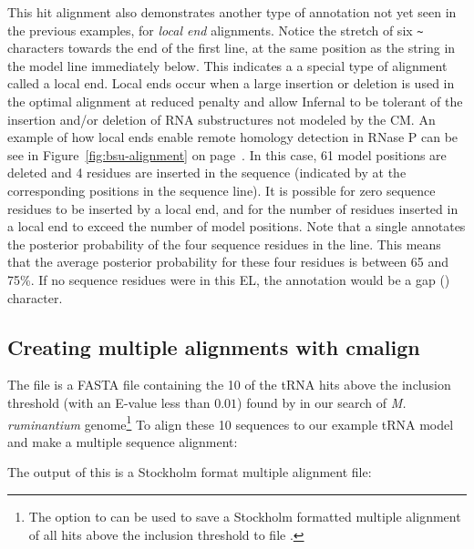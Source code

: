 This hit alignment also demonstrates another type of annotation not
yet seen in the previous examples, for \emph{local end}
alignments. Notice the stretch of six \verb+~+ characters towards the
end of the first  line, at the same position as the string
\otext{*[61]*} in the model line immediately below. This indicates a a
special type of alignment called a local end. Local ends occur when a
large insertion or deletion is used in the optimal alignment at
reduced penalty \citep{KleinEddy03} and allow Infernal to be tolerant
of the insertion and/or deletion of RNA substructures not modeled by
the CM. An example of how local ends enable remote homology detection
in RNase P can be see in Figure~\ref{fig:bsu-alignment} on
page~\pageref{fig:bsu-alignment}. In this case, 61 model positions are
deleted and 4 residues are inserted in the sequence (indicated by
\otext{*[ 4]*} at the corresponding positions in the sequence line).
It is possible for zero sequence residues to be inserted by a local
end, and for the number of residues inserted in a local end to exceed
the number of model positions. Note that a single  annotates
the posterior probability of the four sequence residues in the
 line. This means that the average posterior probability for
these four residues is between 65 and 75\%. If no sequence residues
were in this EL, the  annotation would be a gap ()
character.

\subsection{Creating multiple alignments with cmalign}
The file  is a FASTA file containing
the 10 of the tRNA hits above the inclusion threshold (with an E-value
less than $0.01$) found by  in our 
search of \emph{M. ruminantium} genome\footnote{The
   option to  can be used to save a
  Stockholm formatted multiple alignment of all hits above the
  inclusion threshold to file .}
To align these 10 sequences to our example tRNA model and make a multiple sequence
alignment:


The output of this is a Stockholm format multiple alignment file:

